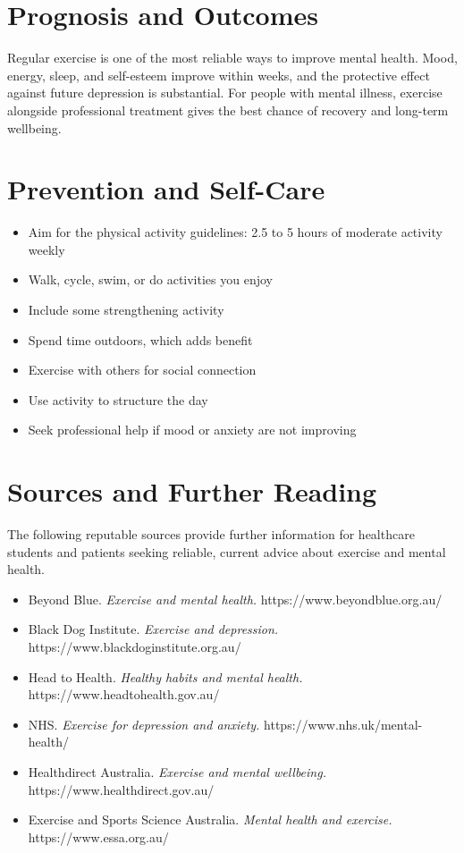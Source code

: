 \section*{Prognosis and Outcomes}
Regular exercise is one of the most reliable ways to improve mental health. Mood, energy, sleep, and self-esteem improve within weeks, and the protective effect against future depression is substantial. For people with mental illness, exercise alongside professional treatment gives the best chance of recovery and long-term wellbeing.

\section*{Prevention and Self-Care}
\begin{itemize}
    \item Aim for the physical activity guidelines: 2.5 to 5 hours of moderate activity weekly
    \item Walk, cycle, swim, or do activities you enjoy
    \item Include some strengthening activity
    \item Spend time outdoors, which adds benefit
    \item Exercise with others for social connection
    \item Use activity to structure the day
    \item Seek professional help if mood or anxiety are not improving
\end{itemize}

\section*{Sources and Further Reading}
The following reputable sources provide further information for healthcare students and patients seeking reliable, current advice about exercise and mental health.
\begin{itemize}
    \item Beyond Blue. \textit{Exercise and mental health.} https://www.beyondblue.org.au/
    \item Black Dog Institute. \textit{Exercise and depression.} https://www.blackdoginstitute.org.au/
    \item Head to Health. \textit{Healthy habits and mental health.} https://www.headtohealth.gov.au/
    \item NHS. \textit{Exercise for depression and anxiety.} https://www.nhs.uk/mental-health/
    \item Healthdirect Australia. \textit{Exercise and mental wellbeing.} https://www.healthdirect.gov.au/
    \item Exercise and Sports Science Australia. \textit{Mental health and exercise.} https://www.essa.org.au/
\end{itemize}
